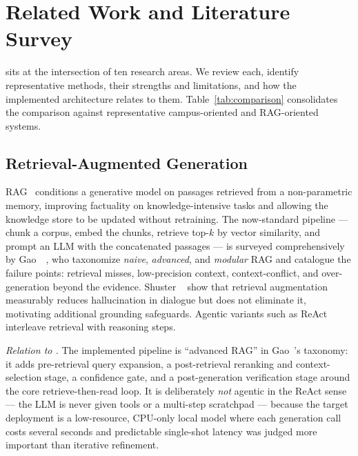 \section{Related Work and Literature Survey}
\label{sec:related}
\system{} sits at the intersection of ten research areas. We review each,
identify representative methods, their strengths and limitations, and how
the implemented architecture relates to them. Table~\ref{tab:comparison}
consolidates the comparison against representative campus-oriented and
RAG-oriented systems.

\subsection{Retrieval-Augmented Generation}
RAG~\cite{lewis2020rag} conditions a generative model on passages retrieved
from a non-parametric memory, improving factuality on knowledge-intensive
tasks and allowing the knowledge store to be updated without retraining.
The now-standard pipeline --- chunk a corpus, embed the chunks, retrieve
top-$k$ by vector similarity, and prompt an LLM with the concatenated
passages --- is surveyed comprehensively by Gao~\etal~\cite{gao2023ragsurvey},
who taxonomize \emph{naive}, \emph{advanced}, and \emph{modular} RAG and
catalogue the failure points: retrieval misses, low-precision context,
context-conflict, and over-generation beyond the evidence. Shuster
\etal~\cite{shuster2021retrieval} show that retrieval augmentation
measurably reduces hallucination in dialogue but does not eliminate it,
motivating additional grounding safeguards. Agentic variants such as
ReAct~\cite{yao2023react} interleave retrieval with reasoning steps.

\emph{Relation to \system{}.} The implemented pipeline is ``advanced RAG''
in Gao~\etal's taxonomy: it adds pre-retrieval query expansion, a
post-retrieval reranking and context-selection stage, a confidence gate,
and a post-generation verification stage around the core retrieve-then-read
loop. It is deliberately \emph{not} agentic in the ReAct sense --- the LLM
is never given tools or a multi-step scratchpad --- because the target
deployment is a low-resource, CPU-only local model where each generation
call costs several seconds and predictable single-shot latency was judged
more important than iterative refinement.

